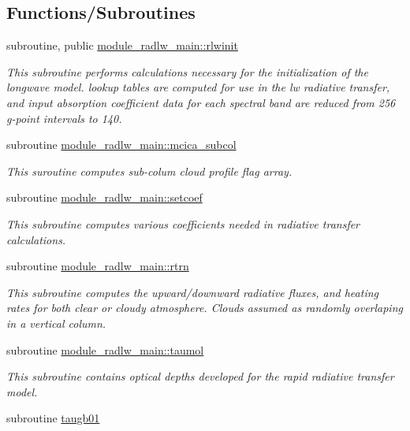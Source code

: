 \subsection*{Functions/\+Subroutines}
\begin{DoxyCompactItemize}
\item 
subroutine, public \hyperlink{group__module__radlw__main_ga916dc850de8c1d18ff9bfd6f63b65d30}{module\+\_\+radlw\+\_\+main\+::rlwinit}
\begin{DoxyCompactList}\small\item\em This subroutine performs calculations necessary for the initialization of the longwave model. lookup tables are computed for use in the lw radiative transfer, and input absorption coefficient data for each spectral band are reduced from 256 g-\/point intervals to 140. \end{DoxyCompactList}\item 
subroutine \hyperlink{group__module__radlw__main_ga378846d33b06ea00ba43d9c3b4c3a661}{module\+\_\+radlw\+\_\+main\+::mcica\+\_\+subcol}
\begin{DoxyCompactList}\small\item\em This suroutine computes sub-\/colum cloud profile flag array. \end{DoxyCompactList}\item 
subroutine \hyperlink{group__module__radlw__main_ga503a8d3f064dfb4cd4503ae98711bab8}{module\+\_\+radlw\+\_\+main\+::setcoef}
\begin{DoxyCompactList}\small\item\em This subroutine computes various coefficients needed in radiative transfer calculations. \end{DoxyCompactList}\item 
subroutine \hyperlink{group__module__radlw__main_gaa42d8cb56a431d3693d3db44733c11e3}{module\+\_\+radlw\+\_\+main\+::rtrn}
\begin{DoxyCompactList}\small\item\em This subroutine computes the upward/downward radiative fluxes, and heating rates for both clear or cloudy atmosphere. Clouds assumed as randomly overlaping in a vertical column. \end{DoxyCompactList}\item 
subroutine \hyperlink{group__module__radlw__main_gac2fa8768f0911fed5343f643953c780d}{module\+\_\+radlw\+\_\+main\+::taumol}
\begin{DoxyCompactList}\small\item\em This subroutine contains optical depths developed for the rapid radiative transfer model. \end{DoxyCompactList}\item 
subroutine \hyperlink{group__module__radlw__main_ga001d1bcd17533f7f920f859ff9a4e60f}{taugb01}
\end{DoxyCompactItemize}
